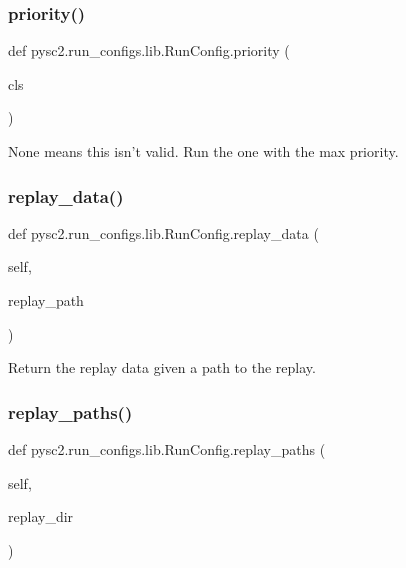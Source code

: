 \subsubsection{\texorpdfstring{priority()}{priority()}}
{\footnotesize\ttfamily def pysc2.\+run\+\_\+configs.\+lib.\+Run\+Config.\+priority (\begin{DoxyParamCaption}\item[{}]{cls }\end{DoxyParamCaption})}

\begin{DoxyVerb}None means this isn't valid. Run the one with the max priority.\end{DoxyVerb}
 \mbox{\label{classpysc2_1_1run__configs_1_1lib_1_1_run_config_a59a4465acde9c23d45d3186275b4b9e9}} 
\subsubsection{\texorpdfstring{replay\+\_\+data()}{replay\_data()}}
{\footnotesize\ttfamily def pysc2.\+run\+\_\+configs.\+lib.\+Run\+Config.\+replay\+\_\+data (\begin{DoxyParamCaption}\item[{}]{self,  }\item[{}]{replay\+\_\+path }\end{DoxyParamCaption})}

\begin{DoxyVerb}Return the replay data given a path to the replay.\end{DoxyVerb}
 \mbox{\label{classpysc2_1_1run__configs_1_1lib_1_1_run_config_ab57b5db47c2e8061b223eac014c77098}} 
\subsubsection{\texorpdfstring{replay\+\_\+paths()}{replay\_paths()}}
{\footnotesize\ttfamily def pysc2.\+run\+\_\+configs.\+lib.\+Run\+Config.\+replay\+\_\+paths (\begin{DoxyParamCaption}\item[{}]{self,  }\item[{}]{replay\+\_\+dir }\end{DoxyParamCaption})}

